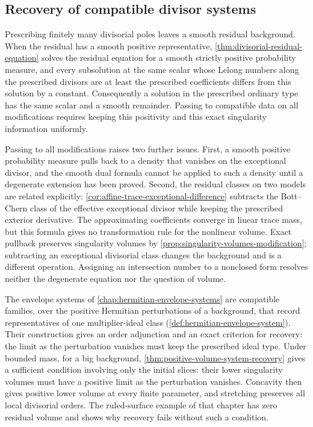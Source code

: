 \subsection{Recovery of compatible divisor systems}

Prescribing finitely many divisorial poles leaves a smooth residual background. When the residual has a smooth positive representative, \cref{thm:divisorial-residual-equation} solves the residual equation for a smooth strictly positive probability measure, and every subsolution at the same scalar whose Lelong numbers along the prescribed divisors are at least the prescribed coefficients differs from this solution by a constant. Consequently a solution in the prescribed ordinary type has the same scalar and a smooth remainder. Passing to compatible data on all modifications requires keeping this positivity and this exact singularity information uniformly.

Passing to all modifications raises two further issues. First, a smooth positive probability measure pulls back to a density that vanishes on the exceptional divisor, and the smooth dual formula cannot be applied to such a density until a degenerate extension has been proved. Second, the residual classes on two models are related explicitly: \cref{cor:affine-trace-exceptional-difference} subtracts the Bott--Chern class of the effective exceptional divisor while keeping the prescribed exterior derivative. The approximating coefficients converge in linear trace mass, but this formula gives no transformation rule for the nonlinear volume. Exact pullback preserves singularity volumes by \cref{prop:singularity-volumes-modification}; subtracting an exceptional divisorial class changes the background and is a different operation. Assigning an intersection number to a nonclosed form resolves neither the degenerate equation nor the question of volume.

The envelope systems of \cref{chap:hermitian-envelope-systems} are compatible families, over the positive Hermitian perturbations of a background, that record representatives of one multiplier-ideal class (\cref{def:hermitian-envelope-system}). Their construction gives an order adjunction and an exact criterion for recovery: the limit as the perturbation vanishes must keep the prescribed ideal type. Under bounded mass, for a big background, \cref{thm:positive-volume-system-recovery} gives a sufficient condition involving only the initial slices: their lower singularity volumes must have a positive limit as the perturbation vanishes. Concavity then gives positive lower volume at every finite parameter, and stretching preserves all local divisorial orders. The ruled-surface example of that chapter has zero residual volume and shows why recovery fails without such a condition.

